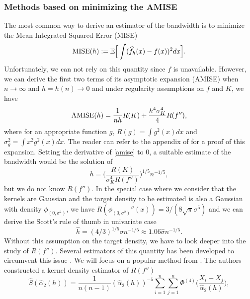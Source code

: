 \subsubsection{Methods based on minimizing the AMISE}
The most common way to derive an estimator of the bandwidth is to minimize the Mean Integrated Squared Error (MISE)
\begin{equation}
    \label{mise}
    \textnormal{MISE}(h) := {\mathbb E}\Big[\int(\widehat f_h(x)-f(x))^2dx \Big].
\end{equation}
Unfortunately, we can not rely on this quantity since $f$ is unavailable. However, we can derive the first two terms of its asymptotic expansion (AMISE) when $n\rightarrow\infty$ and $h=h(n)\rightarrow 0$ and under regularity assumptions on $f$ and $K$, we have
\begin{equation}
\label{amise}
    \textnormal{AMISE}(h) = \frac{1}{nh}R(K) +\frac{h^4\sigma^4_K}{4}R(f''),
\end{equation}
where for an appropriate function $g$, $R(g)=\int g^2(x) dx$ and $\sigma_g^2=\int x^2g^2(x) dx$. The reader can refer to the appendix of \citep{tsybakov2009Nonparametric} for a proof of this expansion. Setting the derivative of \cref{amise} to $0$, a suitable estimate of the bandwidth would be the solution of
\begin{equation}
\label{amise_diff_sol}
    h = \bigg(\frac{R(K)}{\sigma_K^4R(f'')}\bigg)^{1/5}n^{-1/5},
\end{equation}
but we do not know $R(f'')$.  In the special case where we consider that the kernels are Gaussian and the target density to be estimated is also a Gaussian with density $\phi_{(0,\sigma^2)}$, we have $R(\phi_{(0,\sigma^2)}''(x)) = 3/(8\sqrt{\pi}\sigma^5)$ and we can derive the Scott's rule of thumb in univariate case \citep{scott_multivariate_2015}
\begin{equation}
    \hat h = (4/3)^{1/5}\sigma n^{-1/5} \approx 1.06\hat\sigma n^{-1/5}.
\end{equation}
Without this assumption on the target density, we have to look deeper into the study of $R(f'')$. Several estimators of this quantity has been developed to circumvent this issue \citep{HallMarron87}\citep{sheatherj91}\citep{sheather_bdwth}. We will focus on a popular method from \citep{sheather_bdwth}. The authors constructed a kernel density estimator of $R(f'')$
\begin{equation}
\label{sj_est_f2}
    \hat S(\hat\alpha_2(h)) = \frac{1}{n(n-1)}(\hat\alpha_2(h))^{-5}\sum_{i=1}^n\sum_{j=1}^n\Phi^{(4)}\Big(\frac{X_i-X_j}{\hat\alpha_2(h)}\Big),
\end{equation}
